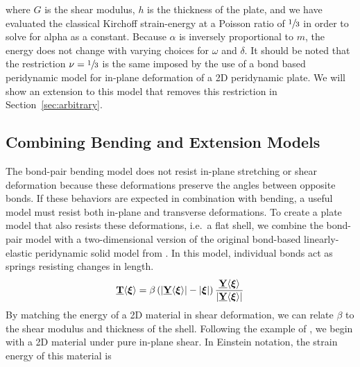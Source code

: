 \documentclass[preprint,review,12pt]{elsarticle}
\newcommand\vstate[3]{%
	\mathbf{\underline{#1}}%
	\ifstrempty{#2}{}{[#2]}%
	\ifstrempty{#3}{}{\langle #3 \rangle}}
\begin{document}
%
where $G$ is the shear modulus, $h$ is the thickness of the plate, and we have evaluated the classical Kirchoff strain-energy at a Poisson ratio of \(\sfrac{1}{3}\) in order to solve for alpha as a constant.  Because $\alpha$ is inversely proportional to $m$, the energy does not change with varying choices for $\omega$ and $\delta$. It should be noted that the restriction \(\nu=\sfrac{1}{3}\) is the same imposed by the use of a bond based peridynamic model for in-plane deformation of a 2D peridynamic plate. We will show an extension to this model that removes this restriction in Section~\ref{sec:arbitrary}.

\subsection{Combining Bending and Extension Models}
The bond-pair bending model does not resist in-plane stretching or shear deformation because these deformations preserve the angles between opposite bonds.   If these behaviors are expected in combination with bending, a useful model must resist both in-plane and transverse deformations.  To create a plate model that also resists these deformations, i.e.\ a flat shell, we combine the bond-pair model with a two-dimensional version of the original bond-based linearly-elastic peridynamic solid model from \cite{silling2000reformulation}.  In this model, individual bonds act as springs resisting changes in length.
%
\begin{equation}
    \label{eq:bondextension}
    \vstate{T}{}{\boldsymbol{\xi}} =\beta\left(|\vstate{Y}{}{\boldsymbol{\xi}}|-|\boldsymbol{\xi}|\right)\frac{\vstate{Y}{}{\boldsymbol{\xi}}}{|\vstate{Y}{}{\boldsymbol{\xi}}|}
\end{equation}
%
By matching the energy of a 2D material in shear deformation, we can relate \(\beta\) to the shear modulus and thickness of the shell.  Following the example of \cite{silling2007peridynamic}, we begin with a 2D material under pure in-plane shear.  In Einstein notation, the strain energy of this material is
%
\end{document}
